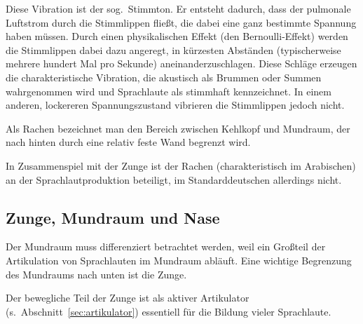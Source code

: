 Diese Vibration ist der sog.\ Stimmton.
Er entsteht dadurch, dass der pulmonale Luftstrom durch die Stimmlippen fließt, die dabei eine ganz bestimmte Spannung haben müssen.
Durch einen physikalischen Effekt (den Bernoulli-Effekt) werden die Stimmlippen dabei dazu angeregt, in kürzesten Abständen (typischerweise mehrere hundert Mal pro Sekunde) aneinanderzuschlagen.
Diese Schläge erzeugen die charakteristische Vibration, die akustisch als Brummen oder Summen wahrgenommen wird und Sprachlaute als stimmhaft kennzeichnet.
In einem anderen, lockereren Spannungszustand vibrieren die Stimmlippen jedoch nicht.


Als Rachen bezeichnet man den Bereich zwischen Kehlkopf und Mundraum, der nach hinten durch eine relativ feste Wand begrenzt wird.


In Zusammenspiel mit der Zunge ist der Rachen (charakteristisch \zB im Arabischen) an der Sprachlautproduktion beteiligt, im Standarddeutschen allerdings nicht.

\subsection{Zunge, Mundraum und Nase}

Der Mundraum muss differenziert betrachtet werden, weil ein Großteil der Artikulation von Sprachlauten im Mundraum abläuft.
Eine wichtige Begrenzung des Mundraums nach unten ist die Zunge.


Der bewegliche Teil der Zunge ist als aktiver Artikulator (s.\ Abschnitt~\ref{sec:artikulator}) essentiell für die Bildung vieler Sprachlaute.

